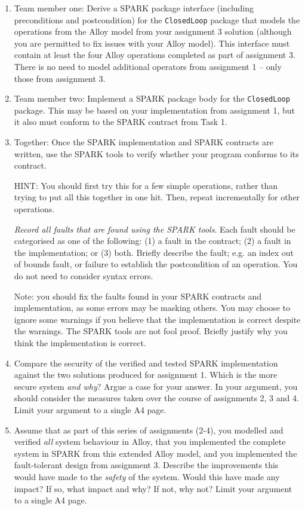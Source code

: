 \documentclass[a4paper,11pt]{article}
\begin{document}
\begin{enumerate}

 \item Team member one: Derive a SPARK package interface (including preconditions and postcondition) for the \texttt{ClosedLoop} package that models the operations from the Alloy model from your assignment 3 solution (although you are permitted to fix issues with your Alloy model). This interface must contain at least the four Alloy operations completed as part of assignment 3. There is no need to model additional operators from assignment 1 -- only those from assignment 3.

 \item Team member two: Implement a SPARK package body for the \texttt{ClosedLoop} package. This may be based on your implementation from assignment 1, but it also must conform to the SPARK contract from Task 1.

 \item Together: Once the SPARK implementation and SPARK contracts are written, use the SPARK tools to verify whether your program conforms to its contract.

  HINT: You should first try this for a few simple operations, rather than trying to put all this together in one hit. Then, repeat incrementally for other operations.

   \emph{Record all faults that are found using the SPARK tools}. Each fault should be categorised as one of the following: (1) a fault in the contract; (2) a fault in the implementation; or (3) both. Briefly describe the fault; e.g. an index out of bounds fault, or failure to establish the postcondition of an operation.
  You do not need to consider syntax errors. 

 Note: you should fix the faults found in your SPARK contracts and implementation, as some errors may be masking others. You may choose to ignore some warnings if you believe that the implementation is correct despite the warnings. The SPARK tools are not fool proof. Briefly justify why you think the implementation is correct.

 \item \label{task:compare-1-3} Compare the security of the verified and tested SPARK implementation against the two solutions produced for assignment 1. Which is the more secure system \emph{and why}? Argue a case for your answer. In your argument, you should consider the measures taken over the course of assignments 2, 3 and 4. Limit your argument to a single A4 page.

 \item \label{task:compare-1-2-3} Assume that as part of this series of assignments (2-4), you modelled and verified \emph{all} system behaviour in Alloy, that you implemented the complete system in SPARK from this extended Alloy model, and you implemented the fault-tolerant design from assignment 3. Describe the improvements this would have made to the \emph{safety} of the system. Would this have made any impact? If so, what impact and why? If not, why not? Limit your argument to a single A4 page.

\end{enumerate}
\end{document}
